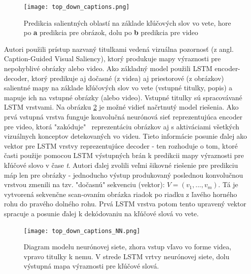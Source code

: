 \begin{figure}[H]
	\begin{center}
		\texttt{[image: top\_down\_captions.png]}
		\caption[Predikcia salientných oblastí na základe kľúčových slov vo vete]{Predikcia salientných oblastí na základe kľúčových slov vo vete, hore po \textbf{a} predikcia pre obrázok, dolu po \textbf{b} predikcia pre video\cite{ramanishka2017top}\label{top_down_captions_image}}
	\end{center}
\end{figure}

Autori použili prístup nazvaný titulkami vedená vizuálna pozornosť (z angl. Caption-Guided Visual Saliency), ktorý produkuje mapy výraznosti pre nepohyblivé obrázky alebo video. Ako základný model použili LSTM encoder-decoder, ktorý predikuje aj dočasné (z videa) aj priestorové (z obrázkov) salientné mapy na základe kľúčových slov vo vete (vstupné titulky, popis) a mapuje ich na vstupné obrázky (alebo video). Vstupné titulky sú spracovávané LSTM vrstvami. Na obrázku \ref{top_down_captions_model_image} je možné vidieť načrtnutý model riešenia. Ako prvá vstupná vrstva funguje konvolučná neurónová sieť reprezentujúca encoder pre video, ktorá "zakóduje" \ reprezentáciu obrázkov aj s aktiváciami všetkých vizuálnych konceptov detekovaných vo videu. Tieto informácie posunie ďalej ako vektor pre LSTM vrstvy reprezentujúce decoder - ten rozhoduje o tom, ktoré časti použije pomocou LSTM výstupných brán k predikcii mapy výraznosti pre kľúčové slovo v čase \textit{t}. Autori ďalej zvolili veľmi šikovné riešenie pre predikciu máp len pre obrázky - jednoducho výstup produkovaný poslednou konvolučnou vrstvou zmenili na tzv. "dočasnú" sekvenciu (vektor): $V = (v_1, . . . , v_m)$. Tá je vytvorená sekvenčne scan-ovaním obrázka riadok po riadku z ľavého horného rohu do pravého dolného rohu. Prvá LSTM vrstva potom tento upravený vektor spracuje a posunie ďalej k dekódovaniu na kľúčové slová vo vete.

\begin{figure}[H]
	\begin{center}
		\texttt{[image: top\_down\_captions\_NN.png]}
		\caption[Model neurónovej siete pre predikciu na základe kľúčových slov]{Diagram modelu neurónovej siete, zhora vstup vľavo vo forme videa, vpravo titulky k nemu. V strede LSTM vrtvy neurónovej siete, dolu výstupná mapa výraznosti pre kľúčové slová. \cite{ramanishka2017top}\label{top_down_captions_model_image}}
	\end{center}
\end{figure}

